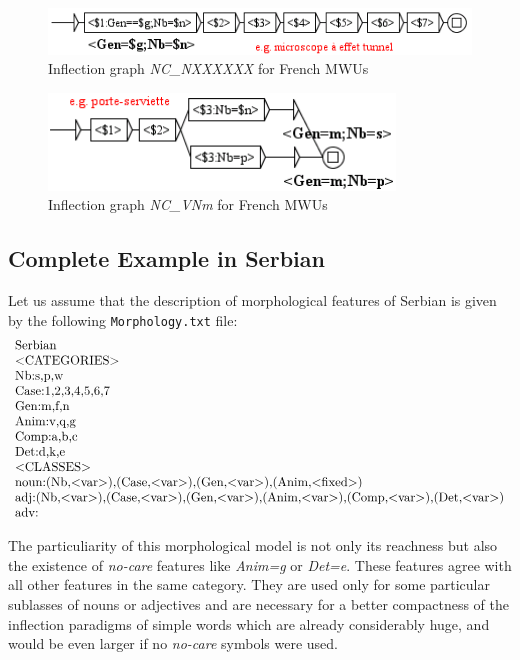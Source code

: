 \begin{figure}[!htb]
  \centering
  \includegraphics[width=12.2cm]{resources/img/NC'NXXXXXX'FR.png}
  \caption{Inflection graph \emph{NC\_NXXXXXX} for French MWUs}
  \label{fig:NC'NXXXXXX'FR}
\end{figure}

\begin{figure}[!htb]
  \centering
  \includegraphics[width=9.2cm]{resources/img/NC'VNm'FR.png}
  \caption{Inflection graph \emph{NC\_VNm} for French MWUs}
  \label{fig:NC'VNm'FR}
\end{figure}


\subsection{Complete Example in Serbian}
Let us assume that the description of morphological features of Serbian is
given by the following \verb+Morphology.txt+ file:
\[
\begin{array}[l]{l}
$Serbian$ \\
$<CATEGORIES>$ \\
$Nb:s,p,w$ \\
$Case:1,2,3,4,5,6,7$ \\
$Gen:m,f,n$ \\
$Anim:v,q,g$ \\
$Comp:a,b,c$ \\
$Det:d,k,e$ \\
$<CLASSES>$ \\
$noun:(Nb,<var>),(Case,<var>),(Gen,<var>),(Anim,<fixed>)$ \\
$adj:(Nb,<var>),(Case,<var>),(Gen,<var>),(Anim,<var>),(Comp,<var>),(Det,<var>)$ \\
$adv:$
\end{array}
\]

\bigskip
\noindent The particuliarity of this morphological model is not only its reachness but also 
the existence of \emph{no-care} features like \emph{Anim=g} or \emph{Det=e}. These features 
agree with all other features in the same category. They are used only for some particular 
sublasses of nouns or adjectives and are necessary for a better compactness of the inflection 
paradigms of simple words which are already considerably huge, and would be even larger if 
no \emph{no-care} symbols were used.  

